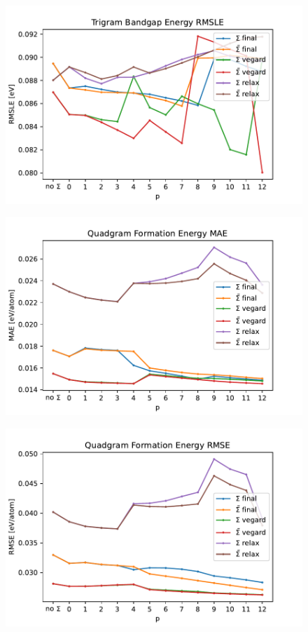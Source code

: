 \documentclass[11pt,oneside,czech,american]{book} %
\theoremstyle{definition} %
\theoremstyle{definition}
\begin{document}
\begin{figure}[H]
	\centering
	\includegraphics[scale=0.6]{trigram_RMSLE_gap.pdf}
	\caption{}
	\label{}
\end{figure}
\begin{figure}[H]
	\centering
	\includegraphics[scale=0.6]{quadgram_MAE_form.pdf}
	\caption{}
	\label{}
\end{figure}
\begin{figure}[H]
	\centering
	\includegraphics[scale=0.6]{quadgram_RMSE_form.pdf}
	\caption{}
	\label{}
\end{figure}
\end{document}
